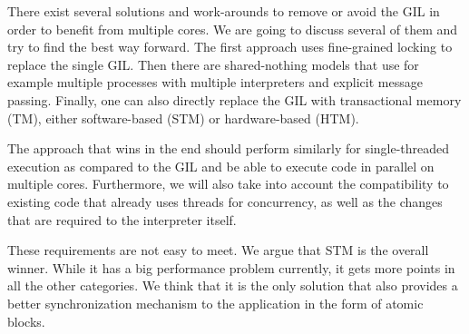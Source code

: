 \documentclass{sigplanconf}
\begin{document}
There exist several solutions and work-arounds to remove or avoid the
GIL in order to benefit from multiple cores. We are going to discuss
several of them and try to find the best way forward. The first
approach uses fine-grained locking to replace the single GIL. Then
there are shared-nothing models that use for example multiple
processes with multiple interpreters and explicit message
passing. Finally, one can also directly replace the GIL with
transactional memory (TM), either software-based (STM) or
hardware-based (HTM).

The approach that wins in the end should perform similarly for
single-threaded execution as compared to the GIL and be able to
execute code in parallel on multiple cores. Furthermore, we will also
take into account the compatibility to existing code that already uses
threads for concurrency, as well as the changes that are required to
the interpreter itself.

These requirements are not easy to meet. We argue that STM is the
overall winner. While it has a big performance problem currently, it
gets more points in all the other categories. We think that it is the
only solution that also provides a better synchronization mechanism to
the application in the form of atomic blocks.





\end{document}

